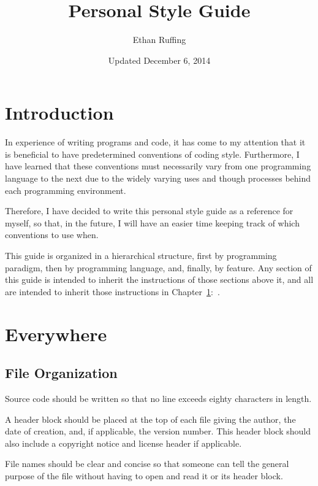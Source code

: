 \documentclass[12pt,letter]{memoir} %
\title{Personal Style Guide}
\author{Ethan Ruffing}
\date{Updated December 6, 2014} %
\begin{document}
\maketitle
\thispagestyle{plainnotice}


\clearpage\mbox{}\thispagestyle{empty}\clearpage

\tableofcontents*

\newpage
\thispagestyle{empty}
\mbox{}

\chapter*{Introduction}
In experience of writing programs and code, it has come to my attention that it
is beneficial to have predetermined conventions of coding style. Furthermore, I
have learned that these conventions must necessarily vary from one programming
language to the next due to the widely varying uses and though processes behind
each programming environment.

Therefore, I have decided to write this personal style guide as a reference for
myself, so that, in the future, I will have an easier time keeping track of
which conventions to use when.

This guide is organized in a hierarchical structure, first by programming
paradigm, then by programming language, and, finally, by feature. Any section of
this guide is intended to inherit the instructions of those sections above it,
and all are intended to inherit those instructions in
Chapter~\ref{chap:everywhere}:~.

\chapter{Everywhere}\label{chap:everywhere}
	\section{File Organization}
		Source code should be written so that no line exceeds eighty characters
		in length.

		A header block should be placed at the top of each file giving the
		author, the date of creation, and, if applicable, the version number.
		This header block should also include a copyright notice and license
		header if applicable.

		File names should be clear and concise so that someone can tell the
		general purpose of the file without having to open and read it or its
		header block.
\end{document}
